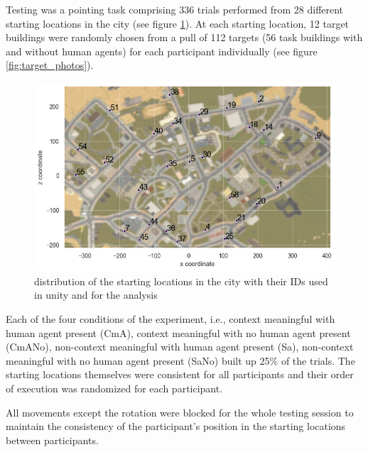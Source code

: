 Testing was a pointing task comprising 336 trials performed from 28 different starting locations in the city (see figure \ref{fig:starting_locs}). At each starting location, 12 target buildings were randomly chosen from a pull of 112 targets (56 task buildings with and without human agents) for each participant individually (see figure \ref{fig:target_photos}). 

\begin{figure}[!htb]
	\raggedright
	\includegraphics[width=140mm]{figures/starting_locations_map_color_numbered.png}
	\caption[Distribution of starting locations]{distribution of the starting locations in the city with their IDs used in unity and for the analysis}
	\label{fig:starting_locs}
\end{figure}

Each of the four conditions of the experiment, i.e., context meaningful with human agent present {\emphasize(CmA)}, context meaningful with no human agent present {\emphasize(CmANo)}, non-context meaningful with human agent present {\emphasize(Sa)}, non-context meaningful with no human agent present {\emphasize(SaNo)} built up 25\% of the trials.  The starting locations themselves were consistent for all participants and their order of execution was randomized for each participant. 

All movements except the rotation were blocked for the whole testing session to maintain the consistency of the participant's position in the starting locations between participants. 

